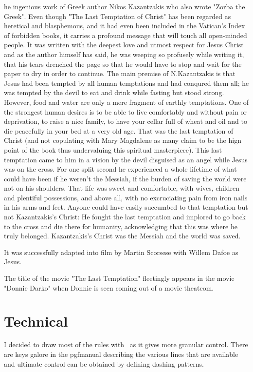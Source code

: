  he ingenious work of Greek author Nikos Kazantzakis who also wrote "Zorba the Greek". Even though "The Last Temptation of Christ" has been regarded as heretical and blasphemous, and it had even been included in the Vatican's Index of forbidden books, it carries a profound message that will touch all open-minded people. It was written with the deepest love and utmost respect for Jesus Christ and as the author himself has said, he was weeping so profusely while writing it, that his tears drenched the page so that he would have to stop and wait for the paper to dry in order to continue. The main premise of N.Kazantzakis is that Jesus had been tempted by all human temptations and had conqured them all; he was tempted by the devil to eat and drink while fasting but stood strong. However, food and water are only a mere fragment of earthly temptations. One of the strongest human desires is to be able to live comfortably and without pain or deprivation, to raise a nice family, to have your cellar full of wheat and oil and to die peacefully in your bed at a very old age. That was the last temptation of Christ (and not copulating with Mary Magdalene as many claim to be the hign point of the book thus undervaluing this spiritual masterpiece). This last temptation came to him in a vision by the devil disguised as an angel while Jesus was on the cross. For one split second he experienced a whole lifetime of what could have been if he weren't the Messiah, if the burden of saving the world were not on his shoulders. That life was sweet and comfortable, with wives, children and plentiful possessions, and above all, with no excruciating pain from iron nails in his arms and feet. Anyone could have easily succumbed to that temptation but not Kazantzakis's Christ: He fought the last temptation and implored to go back to the cross and die there for humanity, acknowledging that this was where he truly belonged. Kazantzakis's Christ was the Messiah and the world was saved. 

It was successfully adapted into film by Martin Scorsese with Willem Dafoe as Jesus. 

The title of the movie "The Last Temptation" fleetingly appears in the movie "Donnie Darko" when Donnie is seen coming out of a movie theateom.    

\section{Technical}  

I decided to draw most of the rules with \tikzname\ as it gives more granular control. There are keys galore
in the pgfmanual describing the various lines that are available and ultimate control can be obtained by defining
dashing patterns.


